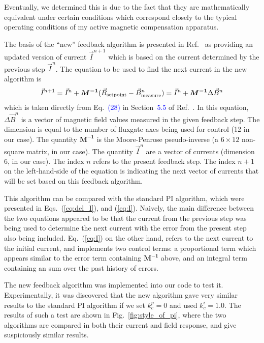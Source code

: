 Eventually, we determined this is due to the fact that they are
mathematically equivalent under certain conditions which correspond
closely to the typical operating conditions of my active magnetic
compensation apparatus.

The basis of the ``new'' feedback algorithm is presented in
Ref.~\cite{rawlik} as providing an updated version of current
$\vec{I}^{n+1}$ which is based on the current determined by the previous
step $\vec{I}^{n}$.  The equation to be used to find the next current in the
new algorithm is
\begin{equation}\label{eq:I_raw}
    \vec{I}^{n+1}= \vec{I}^{n}+\bm{M^{-1}} (\vec{B}_{\rm setpoint}-\vec{B}_{\rm
    measure}^n)=\vec{I}^{n}+\bm{M^{-1}} \Delta  \vec{B}^{n}
\end{equation}
which is taken directly from Eq.~\textcolor{blue}{(28)} in Section~\textcolor{blue}{5.5} of
Ref.~\cite{rawlik}. In this equation, $\Delta  \vec{B}^{n}$ is a vector of
magnetic field values measured in the given feedback step.  The
dimension is equal to the number of fluxgate axes being used for
control (12 in our case).  The quantity $\bm{M^{-1}}$ is the Moore-Penrose
pseudo-inverse (a $6\times 12$ non-square matrix, in our case).  The
quantity $\vec{I}^{n}$ are a vector of currents (dimension 6, in our case).
The index $n$ refers to the present feedback step.
The index $n+1$ on the left-hand-side of the equation is indicating
the next vector of currents that will be set based on this feedback
algorithm.

This algorithm can be compared with the standard PI algorithm, which were
presented in Eqs.~(\ref{eq:del_I}), and (\ref{eq:I}).  Naively, the main
difference between the two equations appeared to be that the current
from the previous step was being used to determine the next current
with the error from the present step also being included.
Eq.~(\ref{eq:I}) on the other hand, refers to the next current to
the initial current, and implements two control terms: a proportional
term which appears similar to the error term containing $\bm{M^{-1}}$
above, and an integral term containing an sum over the past history of
errors.


The new feedback algorithm was implemented into our code to test it.
Experimentally, it was discovered that the new algorithm gave very similar
results to the standard PI algorithm if we set $k_c^p=0$ and used
$k_c^i=1.0$.  The results of such a test are shown in
Fig.~\ref{fig:style_of_pi}, where the two algorithms are compared in
both their current and field response, and give suspiciously similar
results.

